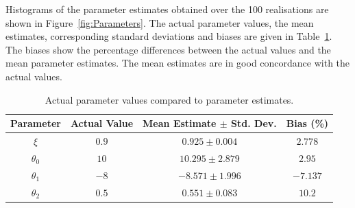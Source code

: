 \documentclass[10pt,a4paper]{article}
\begin{document}
Histograms of the parameter estimates obtained over the 100 realisations are shown in Figure~\ref{fig:Parameters}. The actual parameter values, the mean estimates, corresponding standard deviations and biases are given in Table~\ref{tab:Parameters estimates}. The biases show the percentage differences between the actual values and the mean parameter estimates. The mean estimates are in good concordance with the actual values. 
\begin{table}
\centering
\begin{tabular}{cccc}
	\hline\hline Parameter & Actual Value & Mean Estimate $\pm$ Std. Dev. & Bias (\%) \\
	\hline\hline
 	$\xi$ & $0.9$ & $0.925\pm 0.004$ & $2.778$ \\
	$\theta_0$ & $10$ & $10.295\pm2.879$ & $2.95$\\
	$\theta_1$ & $-8$ & $-8.571\pm1.996$ & $-7.137$\\
	$\theta_2$ & $0.5$ & $0.551\pm0.083$ & $10.2$\\
\hline\hline
\end{tabular}
\caption{Actual parameter values compared to parameter estimates.}
\label{tab:Parameters estimates}
\end{table}
\end{document}
